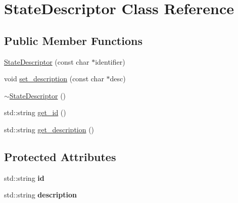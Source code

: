 \hypertarget{class_state_descriptor}{
\section{\-State\-Descriptor \-Class \-Reference}
\label{class_state_descriptor}
}
\subsection*{\-Public \-Member \-Functions}
\begin{DoxyCompactItemize}
\item 
\hyperlink{class_state_descriptor_afc148468d8cd45e8a109a9ed887ef729}{\-State\-Descriptor} (const char $\ast$identifier)
\item 
void \hyperlink{class_state_descriptor_a58265248efa7a27af7e6bbddeab1d74a}{set\-\_\-description} (const char $\ast$desc)
\item 
\hyperlink{class_state_descriptor_a2d9dfc3ddc8c8c4f609f4ff42e8e2bea}{$\sim$\-State\-Descriptor} ()
\item 
std\-::string \hyperlink{class_state_descriptor_a86c0070f308c636a19693a009f0a5464}{get\-\_\-id} ()
\item 
std\-::string \hyperlink{class_state_descriptor_affa74bf68afccd61d263bbbb4b9419ea}{get\-\_\-description} ()
\end{DoxyCompactItemize}
\subsection*{\-Protected \-Attributes}
\begin{DoxyCompactItemize}
\item 
\hypertarget{class_state_descriptor_a6e9e403fcf97cda1dc40bda6428af294}{
std\-::string {\bfseries id}}
\label{class_state_descriptor_a6e9e403fcf97cda1dc40bda6428af294}

\item 
\hypertarget{class_state_descriptor_ae1f4cb2426dd97e0afe6d036c9cd9913}{
std\-::string {\bfseries description}}
\label{class_state_descriptor_ae1f4cb2426dd97e0afe6d036c9cd9913}

\end{DoxyCompactItemize}


